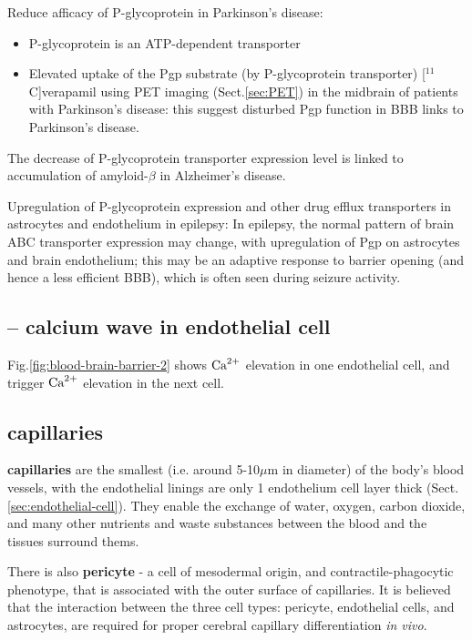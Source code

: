 Reduce afficacy of P-glycoprotein in Parkinson's disease:
\begin{itemize}
  \item P-glycoprotein is an ATP-dependent transporter

  \item Elevated uptake of the Pgp substrate (by P-glycoprotein transporter)
  [$^{11}$C]verapamil using PET imaging (Sect.\ref{sec:PET}) in the midbrain
  of patients with Parkinson's disease: this suggest disturbed Pgp function in
  BBB links to Parkinson's disease.
\end{itemize}

The decrease of P-glycoprotein transporter expression level is linked to
accumulation of amyloid-$\beta$ in Alzheimer's disease.

Upregulation of P-glycoprotein expression and other drug efflux transporters in
astrocytes and endothelium in epilepsy: In epilepsy, the normal pattern of brain
ABC transporter expression may change, with upregulation of Pgp on astrocytes
and brain endothelium; this may be an adaptive response to barrier opening (and
hence a less efficient BBB), which is often seen during seizure activity.

\subsection{-- calcium wave in endothelial cell}

Fig.\ref{fig:blood-brain-barrier-2} shows ${\text{Ca}^{2+}}$ elevation in one endothelial
cell, and trigger ${\text{Ca}^{2+}}$ elevation in the next cell.



\subsection{capillaries}
\label{sec:capillaries}

{\bf capillaries} are the smallest (i.e. around 5-10$\mu$m in diameter) of the
body's blood vessels, with the endothelial linings are only 1 endothelium cell
layer thick (Sect.\ref{sec:endothelial-cell}). They enable  the exchange of
water, oxygen, carbon dioxide, and many other nutrients and waste substances
between the blood and the tissues surround thems.

There is also {\bf pericyte} - a cell of mesodermal origin, and
contractile-phagocytic phenotype, that is associated with the outer surface of
capillaries. It is believed that the interaction between the three cell
types: pericyte, endothelial cells, and astrocytes, are required for proper
cerebral capillary differentiation {\it in vivo}.

